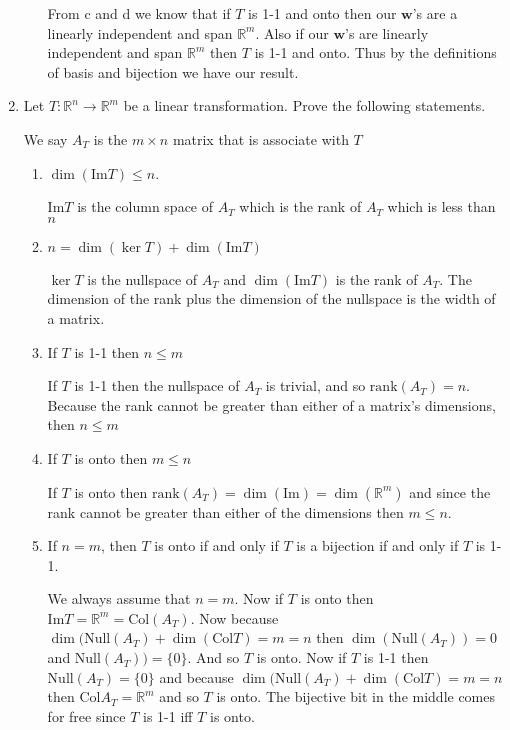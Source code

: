 \documentclass[letterpaper]{article}
\newcommand{\rank}{\text{rank}}
\begin{document}
\begin{enumerate}
\begin{enumerate}
  From c and d we know that if $T$ is 1-1 and onto then our $\mathbf{w}$'s are a linearly independent and span $\mathbb{R}^m$. Also if our $\mathbf{w}$'s are linearly independent and span $\mathbb{R}^m$ then $T$ is 1-1 and onto. Thus by the definitions of basis and bijection we have our result.
  \end{enumerate}
\item
Let $T:\mathbb{R}^n\to\mathbb{R}^m$ be a linear transformation. Prove the following statements.

We say $A_T$ is the $m \times n$ matrix that is associate with $T$
  \begin{enumerate}
  \item
  $\dim(\text{Im}T)\le n$.

  $\text{Im}T$ is the column space of $A_T$ which is the rank of $A_T$ which is less than $n$
  \item
  $n=\dim(\ker T)+\dim(\text{Im}T)$

  $\ker T$ is the nullspace of $A_T$ and $\dim(\text{Im}T)$ is the rank of $A_T$. The dimension of the rank plus the dimension of the nullspace is the width of a matrix.
  \item
  If $T$ is 1-1 then $n\le m$

  If $T$ is 1-1 then the nullspace of $A_T$ is trivial, and so $\rank(A_T)=n$. Because the rank cannot be greater than either of a matrix's dimensions, then $n\le m$
  \item
  If $T$ is onto then $m\le n$

  If $T$ is onto then $\rank(A_T)=\dim(\text{Im})= \dim(\mathbb{R}^m)$ and since the rank cannot be greater than either of the dimensions then $m\le n$.
  \item
  If $n=m$, then $T$ is onto if and only if $T$ is a bijection if and only if $T$ is 1-1.

  We always assume that $n=m$. Now if $T$ is onto then $\text{Im}T=\mathbb{R}^m=\text{Col}(A_T)$. Now because $\dim(\text{Null}(A_T)+\dim(\text{Col}T)=m=n$ then $\dim(\text{Null}(A_T))=0$ and $\text{Null}(A_T))=\{0\}$. And so $T$ is onto. Now if $T$ is 1-1 then $\text{Null}(A_T)=\{0\}$ and because $\dim(\text{Null}(A_T)+\dim(\text{Col}T)=m=n$ then $\text{Col}A_T=\mathbb{R}^m$ and so $T$ is onto. The bijective bit in the middle comes for free since $T$ is 1-1 iff $T$ is onto.
  \end{enumerate}
\end{enumerate}
\end{document}
